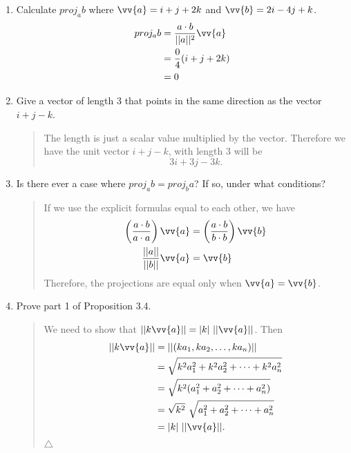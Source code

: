 \documentclass{hw}
\begin{document}
\begin{enumerate}
\item Calculate $proj_{a}b$ where $\vv{a} = i + j + 2k$ and $\vv{b} = 2i - 4j + k$.
\begin{align*}
proj_{a}b &= {a\cdot b \over ||a||^{2}}\vv{a}\\
&= {0\over 4}(i+j+2k)\\
&= 0
\end{align*}

\item Give a vector of length 3 that points in the same direction as the vector $i + j - k$.
\begin{quote}
The length is just a scalar value multiplied by the vector. Therefore we have the unit vector $i + j - k$,
with length 3 will be
\[3i + 3j - 3k.\]
\end{quote}

\item Is there ever a case where $proj_{a}b = proj_{b}a$? If so, under what conditions?
\begin{quote}
If we use the explicit formulas equal to each other, we have
\begin{align*}
\left({a\cdot b \over a\cdot a}\right)\vv{a} &= \left({a\cdot b \over b\cdot b}\right)\vv{b}\\
{||a|| \over ||b||}\vv{a} &= \vv{b}
\end{align*}
Therefore, the projections are equal only when $\vv{a} = \vv{b}$.
\end{quote}

\item Prove part 1 of Proposition 3.4.
\begin{quote}
We need to show that $||k\vv{a}|| = |k|\ ||\vv{a}||$. Then
\begin{align*}
||k\vv{a}|| &= ||(ka_{1},ka_{2},\dots,ka_{n})||\\
&= \sqrt{k^{2}a_{1}^{2} + k^{2}a_{2}^{2} + \cdots + k^{2}a_{n}^{2}}\\
&= \sqrt{k^{2}(a_{1}^{2} + a_{2}^{2} + \cdots + a_{n}^{2})}\\
&= \sqrt{k^{2}}\ \sqrt{a_{1}^{2} + a_{2}^{2} + \cdots + a_{n}^{2}}\\
&= |k|\ ||\vv{a}||.
\end{align*}
$\triangle$
\end{quote}


\end{enumerate}
\end{document}
